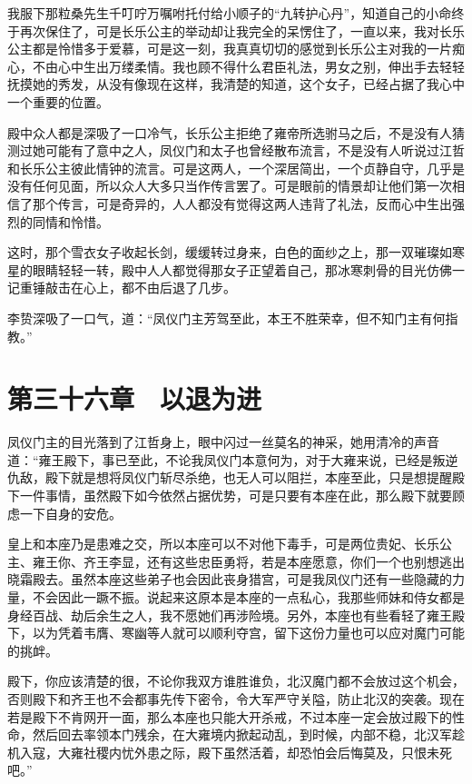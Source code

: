 我服下那粒桑先生千叮咛万嘱咐托付给小顺子的“九转护心丹”，知道自己的小命终于再次保住了，可是长乐公主的举动却让我完全的呆愣住了，一直以来，我对长乐公主都是怜惜多于爱慕，可是这一刻，我真真切切的感觉到长乐公主对我的一片痴心，不由心中生出万缕柔情。我也顾不得什么君臣礼法，男女之别，伸出手去轻轻抚摸她的秀发，从没有像现在这样，我清楚的知道，这个女子，已经占据了我心中一个重要的位置。

殿中众人都是深吸了一口冷气，长乐公主拒绝了雍帝所选驸马之后，不是没有人猜测过她可能有了意中之人，凤仪门和太子也曾经散布流言，不是没有人听说过江哲和长乐公主彼此情钟的流言。可是这两人，一个深居简出，一个贞静自守，几乎是没有任何见面，所以众人大多只当作传言罢了。可是眼前的情景却让他们第一次相信了那个传言，可是奇异的，人人都没有觉得这两人违背了礼法，反而心中生出强烈的同情和怜惜。

这时，那个雪衣女子收起长剑，缓缓转过身来，白色的面纱之上，那一双璀璨如寒星的眼睛轻轻一转，殿中人人都觉得那女子正望着自己，那冰寒刺骨的目光仿佛一记重锤敲击在心上，都不由后退了几步。

李贽深吸了一口气，道：“凤仪门主芳驾至此，本王不胜荣幸，但不知门主有何指教。”

\chapter{第三十六章　以退为进}

凤仪门主的目光落到了江哲身上，眼中闪过一丝莫名的神采，她用清冷的声音道：“雍王殿下，事已至此，不论我凤仪门本意何为，对于大雍来说，已经是叛逆仇敌，殿下就是想将凤仪门斩尽杀绝，也无人可以阻拦，本座至此，只是想提醒殿下一件事情，虽然殿下如今依然占据优势，可是只要有本座在此，那么殿下就要顾虑一下自身的安危。

皇上和本座乃是患难之交，所以本座可以不对他下毒手，可是两位贵妃、长乐公主、雍王你、齐王李显，还有这些忠臣勇将，若是本座愿意，你们一个也别想逃出晓霜殿去。虽然本座这些弟子也会因此丧身猎宫，可是我凤仪门还有一些隐藏的力量，不会因此一蹶不振。说起来这原本是本座的一点私心，我那些师妹和侍女都是身经百战、劫后余生之人，我不愿她们再涉险境。另外，本座也有些看轻了雍王殿下，以为凭着韦膺、寒幽等人就可以顺利夺宫，留下这份力量也可以应对魔门可能的挑衅。

殿下，你应该清楚的很，不论你我双方谁胜谁负，北汉魔门都不会放过这个机会，否则殿下和齐王也不会都事先传下密令，令大军严守关隘，防止北汉的突袭。现在若是殿下不肯网开一面，那么本座也只能大开杀戒，不过本座一定会放过殿下的性命，然后回去率领本门残余，在大雍境内掀起动乱，到时候，内部不稳，北汉军趁机入寇，大雍社稷内忧外患之际，殿下虽然活着，却恐怕会后悔莫及，只恨未死吧。”

